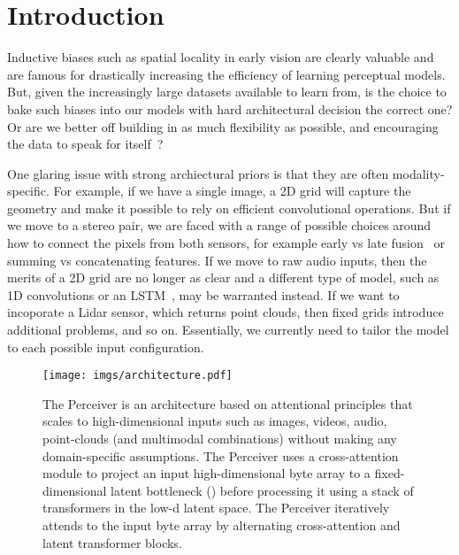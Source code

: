 \documentclass{article}
\begin{document}
\section{Introduction}
\label{submission}

Inductive biases such as spatial locality in early vision are clearly valuable and are famous for drastically increasing the efficiency of learning perceptual models. But, given the increasingly large datasets available to learn from, is the choice to bake such biases into our models with hard architectural decision the correct one? Or are we better off building in as much flexibility as possible, and encouraging the data to speak for itself~\cite{lecun2015deep}?

One glaring issue with strong archiectural priors is that they are often modality-specific. For example, if we have a single image, a 2D grid will capture the geometry and make it possible to rely on efficient convolutional operations. But if we move to a stereo pair, we are faced with a range of possible choices around how to connect the pixels from both sensors, for example early vs late fusion~\cite{karpathy2014largescale} or summing vs concatenating features. If we move to raw audio inputs, then the merits of a 2D grid are no longer as clear and a different type of model, such as 1D convolutions or an LSTM~\cite{hochreiter1997long,6638947}, may be warranted instead. If we want to incoporate a Lidar sensor, which returns point clouds, then fixed grids introduce additional problems, and so on. Essentially, we currently need to tailor the model to each possible input configuration.

\begin{figure*}[t]
    \centering
    \texttt{[image: imgs/architecture.pdf]}
    \vspace{-10pt}
    \caption{The Perceiver is an architecture based on attentional principles that scales to high-dimensional inputs such as images, videos, audio, point-clouds (and multimodal combinations) without making any domain-specific assumptions. The Perceiver uses a cross-attention module to project an input high-dimensional byte array to a fixed-dimensional latent bottleneck () before processing it using a stack of transformers in the low-d latent space. The Perceiver iteratively attends to the input byte array by alternating cross-attention and latent transformer blocks.}
    \label{fig:architecture}
    \vspace{-8pt}
\end{figure*}
\end{document}
